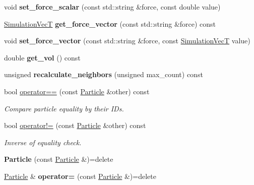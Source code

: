 \begin{DoxyCompactItemize}
void {\bfseries set\+\_\+force\+\_\+scalar} (const std\+::string \&force, const double value)
\item 
\mbox{\label{classwash_1_1Particle_a9c6ec5d5a7407897ecca00549bd05c01}} 
\mbox{\hyperlink{classwash_1_1Vec}{Simulation\+VecT}} {\bfseries get\+\_\+force\+\_\+vector} (const std\+::string \&force) const
\item 
\mbox{\label{classwash_1_1Particle_a6960cdd169d1829a52e49cf835a8bfeb}} 
void {\bfseries set\+\_\+force\+\_\+vector} (const std\+::string \&force, const \mbox{\hyperlink{classwash_1_1Vec}{Simulation\+VecT}} value)
\item 
\mbox{\label{classwash_1_1Particle_ab16021a2c003de07dc0a418ffc3d5eb7}} 
double {\bfseries get\+\_\+vol} () const
\item 
\mbox{\label{classwash_1_1Particle_a570fc3286ab83d081950a5fb3d548d92}} 
unsigned {\bfseries recalculate\+\_\+neighbors} (unsigned max\+\_\+count) const
\item 
bool \mbox{\hyperlink{classwash_1_1Particle_a32369e6edba4277ebc71917a37c2503d}{operator==}} (const \mbox{\hyperlink{classwash_1_1Particle}{Particle}} \&other) const
\begin{DoxyCompactList}\small\item\em Compare particle equality by their I\+Ds. \end{DoxyCompactList}\item 
bool \mbox{\hyperlink{classwash_1_1Particle_a32f1334a8a0b273a57355956d7e9fe63}{operator!=}} (const \mbox{\hyperlink{classwash_1_1Particle}{Particle}} \&other) const
\begin{DoxyCompactList}\small\item\em Inverse of equality check. \end{DoxyCompactList}\item 
\mbox{\label{classwash_1_1Particle_a9ca04366cb7412e6aa5d1d89108a8520}} 
{\bfseries Particle} (const \mbox{\hyperlink{classwash_1_1Particle}{Particle}} \&)=delete
\item 
\mbox{\label{classwash_1_1Particle_a8ac44cec043e444a45ab189f666f9d4b}} 
\mbox{\hyperlink{classwash_1_1Particle}{Particle}} \& {\bfseries operator=} (const \mbox{\hyperlink{classwash_1_1Particle}{Particle}} \&)=delete
\end{DoxyCompactItemize}
